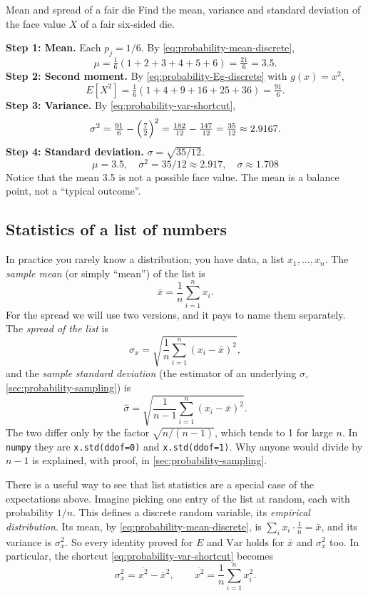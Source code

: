 \begin{sample}{Mean and spread of a fair die}
Find the mean, variance and standard deviation of the face value $X$ of a fair six-sided die.

\textbf{Step 1: Mean.} Each $p_j=1/6$. By \cref{eq:probability-mean-discrete},
\[
\mu = \tfrac16(1+2+3+4+5+6) = \tfrac{21}{6}=3.5 .
\]
\textbf{Step 2: Second moment.} By \cref{eq:probability-Eg-discrete} with $g(x)=x^2$,
\[
E[X^2]=\tfrac16(1+4+9+16+25+36)=\tfrac{91}{6}.
\]
\textbf{Step 3: Variance.} By \cref{eq:probability-var-shortcut},
\[
\sigma^2 = \tfrac{91}{6}-\Bigl(\tfrac72\Bigr)^2 = \tfrac{182}{12}-\tfrac{147}{12} = \tfrac{35}{12}\approx 2.9167 .
\]
\textbf{Step 4: Standard deviation.} $\sigma=\sqrt{35/12}$.
\[
\boxed{\mu=3.5,\quad \sigma^2=35/12\approx2.917,\quad \sigma\approx1.708}
\]
Notice that the mean 3.5 is not a possible face value. The mean is a balance point, not a ``typical outcome''.
\end{sample}

\subsection{Statistics of a list of numbers}

In practice you rarely know a distribution; you have data, a list $x_1,\dots,x_n$. The \emph{sample mean} (or simply ``mean'') of the list is
\begin{equation}
\bar x = \frac1n\sum_{i=1}^n x_i .
\label{eq:probability-sample-mean}
\end{equation}
For the spread we will use two versions, and it pays to name them separately. The \emph{spread of the list} is
\begin{equation}
\sigma_x = \sqrt{\frac1n\sum_{i=1}^n (x_i-\bar x)^2},
\label{eq:probability-sigma-list}
\end{equation}
and the \emph{sample standard deviation} (the estimator of an underlying $\sigma$, \cref{sec:probability-sampling}) is
\begin{equation}
\hat\sigma = \sqrt{\frac1{n-1}\sum_{i=1}^n (x_i-\bar x)^2}.
\label{eq:probability-sigma-hat}
\end{equation}
The two differ only by the factor $\sqrt{n/(n-1)}$, which tends to 1 for large $n$. In \texttt{numpy} they are \texttt{x.std(ddof=0)} and \texttt{x.std(ddof=1)}. Why anyone would divide by $n-1$ is explained, with proof, in \cref{sec:probability-sampling}.

There is a useful way to see that list statistics are a special case of the expectations above. Imagine picking one entry of the list at random, each with probability $1/n$. This defines a discrete random variable, its \emph{empirical distribution}. Its mean, by \cref{eq:probability-mean-discrete}, is $\sum_i x_i\cdot\frac1n=\bar x$, and its variance is $\sigma_x^2$. So every identity proved for $E$ and $\mathrm{Var}$ holds for $\bar x$ and $\sigma_x^2$ too. In particular, the shortcut \cref{eq:probability-var-shortcut} becomes
\begin{equation}
\sigma_x^2 = \overline{x^2} - \bar x^2,\qquad \overline{x^2} = \frac1n\sum_{i=1}^n x_i^2 .
\label{eq:probability-list-shortcut}
\end{equation}

